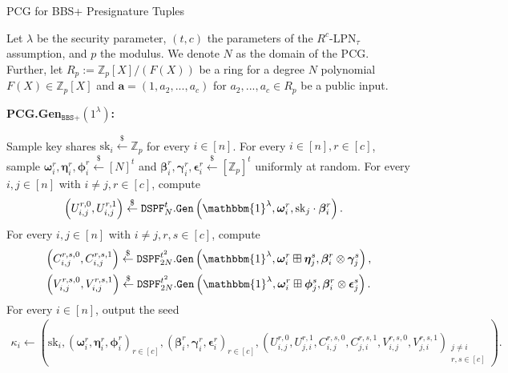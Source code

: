 \begin{specialconstruction}{PCG for BBS+ Presignature Tuples}
\label{construction:PCGforBBS+}
\vspace{1em}

Let $\lambda$ be the security parameter, $(t,c)$ the parameters of the $R^c$-LPN$_\tau$ assumption, and $p$ the modulus. We denote $N$ as the domain of the PCG. Further, let $R_p:=\mathbb{Z}_{p}[X]/(F(X))$ be a ring for a degree $N$ polynomial $F(X) \in \mathbb{Z}_{p}[X]$ and $\boldsymbol{a} = (1, a_2, ..., a_c)$ for $a_2, ...,a_c \in R_p$ be a public input.

\vspace{1em}

\textbf{PCG.Gen$_{\texttt{BBS+}}(1^\lambda)$:}

\begin{algorithmic}[1]
\State Sample key shares $\mathrm{sk}_{i} \stackrel{\$}{\leftarrow} \mathbb{Z}_{p}$ for every $i \in [n]$.
\State For every $i \in [n], r \in [c]$, sample $\boldsymbol{\omega}_{i}^{r}, \boldsymbol{\eta}_{i}^{r}, \boldsymbol{\phi}_{i}^{r} \stackrel{\$}{\leftarrow} [N]^{t}$ and $\boldsymbol{\beta}_{i}^{r}, \boldsymbol{\gamma}_{i}^{r}, \boldsymbol{\epsilon}_{i}^{r} \stackrel{\$}{\leftarrow} [\mathbb{Z}_{p}]^{t}$ uniformly at random.
\State For every $i, j \in [n]$ with $i \neq j, r \in [c]$, compute
\begin{align*}
& \left(U_{i, j}^{r, 0}, U_{i, j}^{r, 1}\right) \stackrel{\$}{\leftarrow} \texttt{DSPF}_{N}^{t}.\texttt{Gen}\left(\mathbbm{1}^{\lambda}, \boldsymbol{\omega}_{i}^{r}, \mathrm{sk}_{j} \cdot \boldsymbol{\beta}_{i}^{r}\right).
\end{align*}
\State For every $i, j \in [n]$ with $i \neq j, r, s \in [c]$, compute
\begin{align*}
& \left(C_{i, j}^{r, s, 0}, C_{i, j}^{r, s, 1}\right)\stackrel{\$}{\leftarrow} \texttt{DSPF}_{2N}^{t^{2}}.\texttt{Gen}\left(\mathbbm{1}^{\lambda}, \boldsymbol{\omega}_{i}^{r} \boxplus \boldsymbol{\eta}_{j}^{s}, \boldsymbol{\beta}_{i}^{r} \otimes \boldsymbol{\gamma}_{j}^{s}\right), \\
& \left(V_{i, j}^{r, s, 0}, V_{i, j}^{r, s, 1}\right) \stackrel{\$}{\leftarrow} \texttt{DSPF}_{2N}^{t^{2}}.\texttt{Gen}\left(\mathbbm{1}^{\lambda}, \boldsymbol{\omega}_{i}^{r} \boxplus \boldsymbol{\phi}_{j}^{s}, \boldsymbol{\beta}_{i}^{r} \otimes \boldsymbol{\epsilon}_{j}^{s}\right).
\end{align*}
\State For every $i \in [n]$, output the seed
\begin{align*}
\kappa_{i} \leftarrow\left(\mathrm{sk}_{i},\left(\boldsymbol{\omega}_{i}^{r}, \boldsymbol{\eta}_{i}^{r}, \boldsymbol{\phi}_{i}^{r}\right)_{r \in [c]},\left(\boldsymbol{\beta}_{i}^{r}, \boldsymbol{\gamma}_{i}^{r}, \boldsymbol{\epsilon}_{i}^{r}\right)_{r \in [c]},\left(U_{i, j}^{r, 0}, U_{j, i}^{r, 1}, C_{i, j}^{r, s, 0}, C_{j, i}^{r, s, 1}, V_{i, j}^{r, s, 0}, V_{j, i}^{r, s, 1}\right)_{\substack{j \neq i \\ r, s \in [c]}}\right).
\end{align*}
\end{algorithmic}


\end{specialconstruction}
